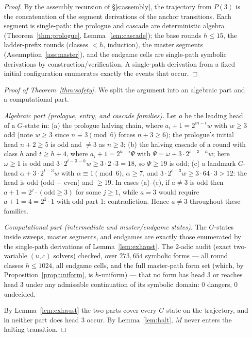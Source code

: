 \documentclass[11pt]{amsart}
\theoremstyle{definition}
\begin{document}
\begin{proof}
By the assembly recursion of \S\ref{s:assembly}, the trajectory from $P(3)$
is the concatenation of the segment derivations of the anchor transitions.
Each segment is single-path: the prologue and cascade are deterministic
algebra (Theorem~\ref{thm:prologue}, Lemma~\ref{lem:cascade}); the base
rounds $h\le15$, the ladder-prefix rounds (classes $<h$, induction), the
master segments (Assumption~\ref{ass:master}), and the endgame cells are
single-path symbolic derivations by construction/verification. A
single-path derivation from a fixed initial configuration enumerates
exactly the events that occur.
\end{proof}

\begin{proof}[Proof of Theorem~\ref{thm:safety}]
We split the argument into an algebraic part and a computational part.

\emph{Algebraic part (prologue, entry, and cascade families).}
Let $a$ be the leading head of a $G$-state in:
(a) the prologue halving chain, where $a_i+1=2^{m-i}w$ with $w\ge3$ odd
(note $w\ge3$ since $n\equiv3\pmod6$ forces $n+3\ge6$); the prologue's
initial head $n+2\ge5$ is odd and $\ne3$ as $n\ge3$;
(b) the halving cascade of a round with class $h$ and $t\ge h+4$, where
$a_i+1=2^{h-i}\Psi$ with $\Psi=\omega+3\cdot2^{t-3-h}w$;
here $\omega\ge1$ is odd and $3\cdot2^{t-3-h}w\ge3\cdot2\cdot3=18$, so
$\Psi\ge19$ is odd;
(c) a landmark $G$-head $\alpha+3\cdot2^{t-3}w$ with $\alpha\equiv1\pmod6$,
$\alpha\ge7$, and $3\cdot2^{t-3}w\ge3\cdot64\cdot3>12$: the head is odd
(odd $+$ even) and $\ge19$.
In cases (a)--(c), if $a\ne3$ is odd then $a+1=2^{j}\cdot(\text{odd}\ge3)$
for some $j\ge1$, while $a=3$ would require $a+1=4=2^{2}\cdot1$ with odd
part $1$: contradiction. Hence $a\ne3$ throughout these families.

\emph{Computational part (intermediate and master/endgame states).}
The $G$-states inside sweeps, master segments, and endgames are exactly
those enumerated by the single-path derivations of
Lemma~\ref{lem:exhaust}. The $2$-adic audit (exact two-variable $(u,c)$
solvers) checked, over $273{,}654$ symbolic forms --- all round classes
$h\le1024$, all endgame cells, and the full master-path form set (which,
by Proposition~\ref{prop:uniform}, is $h$-uniform) --- that no form has
head $3$ or reaches head $3$ under any admissible continuation of its
symbolic domain: $0$ dangers, $0$ undecided.

By Lemma~\ref{lem:exhaust} the two parts cover every $G$-state on the
trajectory, and in neither part does head $3$ occur. By
Lemma~\ref{lem:halt}, $M$ never enters the halting transition.
\end{proof}
\end{document}
